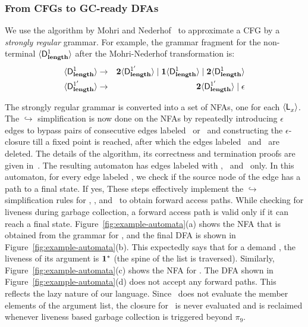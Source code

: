 \documentclass[preprint, 9pt]{sigplanconf}
\newcommand{\warning}[1]{{\color{Myred}{#1}}}
\begin{document}
\subsubsection{From CFGs to GC-ready DFAs}
\label{sec:NFA-approx}
 We use  the algorithm by Mohri  and Nederhof~\cite{mohri00regular} to
 approximate a CFG by a {\em strongly regular\/} grammar.  For
 example, the grammar
 fragment  for  the  non-terminal  $\langle \mathsf{D}_{\mathit {\mathbf{length}}}^{1}\rangle$  after  the
 Mohri-Nederhof transformation is:
 \begin{eqnarray*}
   \langle \mathsf{D}_{\mathit {\mathbf{length}}}^{1}\rangle &\rightarrow& {\mathbf{2}}\langle \mathsf{D}_{\mathit {\mathbf{length}}}^{1'}\rangle \mid
   \mathbf{1}\langle \mathsf{D}_{\mathit {\mathbf{length}}}^{1}\rangle
   \mid {\mathbf{2}}\langle \mathsf{D}_{\mathit {\mathbf{length}}}^{1}\rangle\\
   \langle \mathsf{D}_{\mathit {\mathbf{length}}}^{1'}\rangle &\rightarrow& {\mathbf{2}}\langle \mathsf{D}_{\mathit {\mathbf{length}}}^{1'}\rangle
   \mid \epsilon
 \end{eqnarray*}

The strongly regular grammar is converted  into a set of NFAs, one for
each $\langle \mathsf{L}_{{x}}^{}\rangle$.  The  $\hookrightarrow$ simplification is now
done on the NFAs by  repeatedly introducing $\epsilon$ edges to bypass
pairs  of consecutive  edges  labeled \bcar\acar\  or \bcdr\acdr\  and
constructing  the $\epsilon$-closure  till a  fixed point  is reached,
after which  the edges labeled  \bcar \  and \bcdr\ are  deleted.  The
details of the  algorithm, its correctness and  termination proofs are
given  in~\cite{karkare07liveness,asati14lgc}.   The
resulting  automaton   has  edges  labeled  with   \acar,  \acdr\  and
\clazy\ only.  In this  automaton, for every  edge labeled  \clazy, we
check if the source node of the edge has a path to a final 
state.  If yes, \warning{we mark the mark the source node as final. Finally, we
remove all the edges labeled \clazy\  and convert the automaton into a
deterministic    automaton.}    These steps   effectively   implement    the
$\hookrightarrow$   simplification  rules   for   \bcar,  \bcdr,   and
\clazy\ to  obtain forward access paths.  While checking for  liveness during
garbage  collection, a  forward access path  is valid  only if  it can
reach a  final state.  Figure~\ref{fig:example-automata}(a)  shows the
NFA that is obtained from  the grammar for , and   the
final  DFA  is  shown in  Figure~\ref{fig:example-automata}(b).   This
expectedly  says that for a  demand  \warning{$\epsilon$  on  \length},  the
liveness of  its argument  is $\mathbf{1}^{*}$  (the spine  of the  list is
traversed).  Similarly, Figure~\ref{fig:example-automata}(c) shows the
NFA     for     \var{\Lanv{\pa}{}}.      The     DFA     shown     in
Figure~\ref{fig:example-automata}(d)  does  not   accept  any  forward
paths.   This  reflects  the  lazy  nature  of  our  language.   Since
\length\ does not  evaluate the member elements of  the argument list,
the  closure for  \pa\ is  never evaluated  and is  reclaimed whenever
liveness based garbage collection is triggered beyond $\pi_9$.
\end{document}
